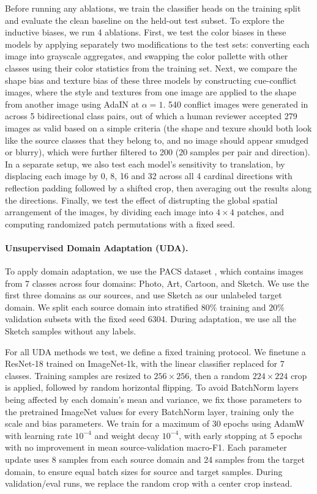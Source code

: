 \documentclass{article}
\begin{document}
Before running any ablations, we train the classifier heads on the training split and evaluate the clean baseline on the held-out test subset.
To explore the inductive biases, we run 4 ablations. First, we test the color biases in these models by applying separately two modifications to the test sets: converting each image into grayscale aggregates, and swapping the color pallette with other classes using their color statistics from the training set.
Next, we compare the shape bias and texture bias of these three models by constructing cue-conflict images, where the style and textures from one image are applied to the shape from another image using AdaIN \citep{huang2017adain} at $\alpha=1$. 540 conflict images were generated in  across 5 bidirectional class pairs, out of which a human reviewer accepted 279 images as valid based on a simple criteria (the shape and texure should both look like the source classes that they belong to, and no image should appear smudged or blurry), which were further filtered to 200 (20 samples per pair and direction).
In a separate setup, we also test each model's sensitivity to translation, by displacing each image by 0, 8, 16 and 32 across all 4 cardinal directions with reflection padding followed by a shifted crop, then averaging out the results along the directions.
Finally, we test the effect of distrupting the global spatial arrangement of the images, by dividing each image into $4\times4$ patches, and computing randomized patch permutations with a fixed seed.



\paragraph{Unsupervised Domain Adaptation (UDA).}\mbox{}\par
To apply domain adaptation, we use the PACS dataset \citep{li2017pacs}, which contains images from 7 classes across four domains: Photo, Art, Cartoon, and Sketch. We use the first three domains as our sources, and use Sketch as our unlabeled target domain. We split each source domain into stratified $80\%$ training and $20\%$ validation subsets with the fixed seed 6304. During adaptation, we use all the Sketch samples without any labels.

For all UDA methods we test, we define a fixed training protocol. We finetune a ResNet-18 trained on ImageNet-1k, with the linear classifier replaced for 7 classes. Training samples are resized  to $256\times256$, then a
random $224\times224$ crop is applied, followed by random horizontal flipping. To avoid BatchNorm layers being affected by each domain's mean and variance, we fix those parameters to the pretrained ImageNet values for every BatchNorm layer, training only the scale and bias parameters. We train for a maximum of 30 epochs using AdamW with learning rate $10^{-4}$ and weight decay $10^{-4}$, with early stopping at 5 epochs with no improvement in mean source-validation macro-F1. Each parameter update uses 8 samples from each source domain and 24 samples from the target domain, to ensure equal batch sizes for source and target samples. During validation/eval runs, we replace the random crop with a center crop instead.
\end{document}
